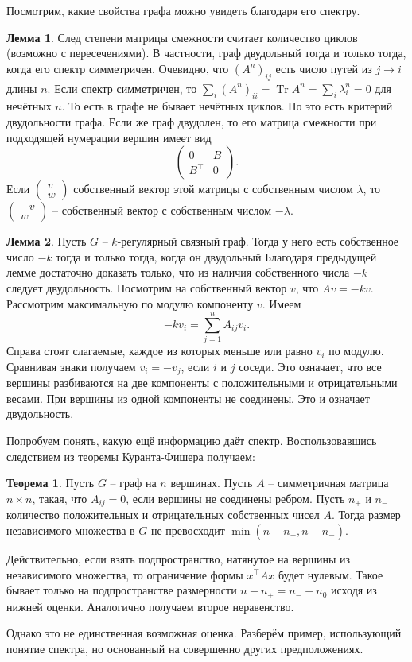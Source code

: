 \documentclass[10pt,a4paper,oneside]{book}
\theoremstyle{definition}
\newtheorem{thm}{{\color{red!40!black} Теорема}}
\newtheorem{lem}{{\color{green!50!black} Лемма}}
\newcommand{\Tr}{\operatorname{Tr}}
\def\thrm{\begin{thm}}
\def\ethrm{\end{thm}}
\def\lm{\begin{lem}}
\def\elm{\end{lem}}
\def\pmat{\begin{pmatrix}}
\def\epmat{\end{pmatrix}}
\begin{document}
Посмотрим, какие свойства графа можно увидеть благодаря его спектру.

\lm  След степени матрицы смежности считает количество циклов (возможно с пересечениями). В частности, граф двудольный тогда и только тогда, когда его спектр симметричен. 
\proof Очевидно, что $(A^n)_{ij}$ есть число путей из $j\to i$ длины $n$. Если спектр симметричен, то $\sum_i (A^n)_{ii}= \Tr A^n = \sum_i \lambda_i^n =0$ для нечётных $n$. То есть в графе не бывает нечётных циклов. Но это есть критерий двудольности графа. Если же граф двудолен, то его матрица смежности при подходящей нумерации вершин имеет вид 
$$\pmat 0 & B \\ 
B^{\top} & 0 \epmat.$$
Если $\pmat v\\ w\epmat$ собственный вектор этой матрицы с собственным числом $\lambda$, то $\pmat -v\\ w\epmat$ -- собственный вектор с собственным числом $-\lambda$.
\endproof
\elm

\lm Пусть $G$ -- $k$-регулярный связный граф. Тогда у него есть собственное число $-k$ тогда и только тогда, когда он двудольный
\proof Благодаря предыдущей лемме достаточно доказать только, что из наличия собственного числа $-k$ следует двудольность. Посмотрим на собственный вектор $v$, что $Av=-kv$. Рассмотрим максимальную по модулю компоненту $v$. Имеем 
$$-kv_i=\sum_{j=1}^n A_{ij}v_i.$$
Справа стоят слагаемые, каждое из которых меньше или равно $v_i$ по модулю. Сравнивая знаки получаем $v_i=-v_j$, если $i$ и $j$ соседи. Это означает, что все вершины разбиваются на две компоненты с положительными и отрицательными весами. При вершины из одной компоненты не соединены. Это и означает двудольность. 
\endproof
\elm


Попробуем понять, какую ещё информацию даёт спектр. Воспользовавшись следствием из теоремы Куранта-Фишера получаем:

\thrm Пусть $G$ -- граф на $n$ вершинах. Пусть $A$ -- симметричная матрица $n\times n$, такая, что $A_{ij}= 0$, если вершины не соединены ребром. Пусть $n_{+}$ и $n_{-}$ количество положительных и отрицательных собственных чисел $A$. Тогда размер независимого множества в $G$ не превосходит $\min(n-n_{+},n-n_{-})$.
\ethrm
\proof Действительно, если взять подпространство, натянутое на вершины из независимого множества, то ограничение формы $x^{\top}Ax$ будет нулевым. Такое бывает только на подпространстве размерности $n-n_{+}=n_{-}+n_0$ исходя из нижней оценки. Аналогично получаем второе неравенство.
\endproof

Однако это не единственная возможная оценка. Разберём пример, использующий понятие спектра, но основанный на совершенно других предположениях.
\end{document}
